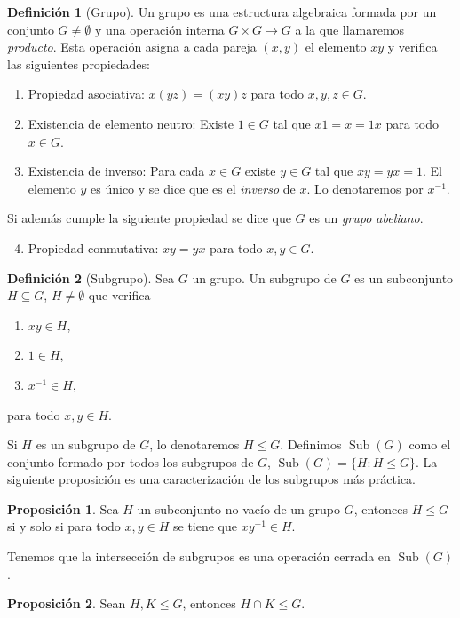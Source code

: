 \documentclass[12pt]{book}
\theoremstyle{definition}
\newtheorem{defi}{Definición}[section]
\newtheorem{prop}{Proposición}[section]
\begin{document}
\begin{defi}[Grupo]
Un grupo es una estructura algebraica formada por un conjunto $G\neq\emptyset$ y una operación interna $G\times G\rightarrow G$ a la que llamaremos \textit{producto}. Esta operación asigna a cada pareja $(x,y)$ el elemento $xy$ y verifica las siguientes propiedades:

\begin{enumerate}
\item Propiedad asociativa: $x(yz) = (xy)z$ para todo $x,y,z\in G$.
\item Existencia de elemento neutro: Existe $1\in G$ tal que $x1= x = 1x$ para todo $ x\in G$.
\item Existencia de inverso: Para cada $x \in G$ existe $y\in G$ tal que $xy=yx = 1$. El elemento $y$ es único y se dice que es el \textit{inverso} de $x$. Lo denotaremos por $x^{-1}$.
\end{enumerate}
Si además cumple la siguiente propiedad se dice que $G$ es un \textit{grupo abeliano}.
\begin{enumerate}
\setcounter{enumi}{3}
\item Propiedad conmutativa: $xy=yx$ para todo $x,y\in G$.
\end{enumerate}
\end{defi}

\begin{defi}[Subgrupo]
Sea $G$ un grupo. Un subgrupo de $G$ es un subconjunto $H\subseteq G$, $H\neq\emptyset$ que verifica
\begin{enumerate}
\item $xy\in H$,
\item $1\in H$,
\item $x^{-1}\in H,$
\end{enumerate}
para todo $x,y\in H.$

Si $H$ es un subgrupo de $G$, lo denotaremos $H\leq G$. Definimos $\operatorname{Sub}(G)$ como el conjunto formado por todos los subgrupos de $G$, $\operatorname{Sub}(G)=\{H:H\leq G\}$. La siguiente proposición es una caracterización de los subgrupos más práctica.

\begin{prop}
Sea $H$ un subconjunto no vacío de un grupo $G$, entonces $H\leq G$ si y solo si para todo $x,y\in H$ se tiene que $xy^{-1}\in H$.
\end{prop}

Tenemos que la intersección de subgrupos es una operación cerrada en $\operatorname{Sub}(G)$.
\begin{prop}
Sean $H,K\leq G$, entonces $H\cap K\leq G.$
\end{prop}



\end{defi}
\end{document}
